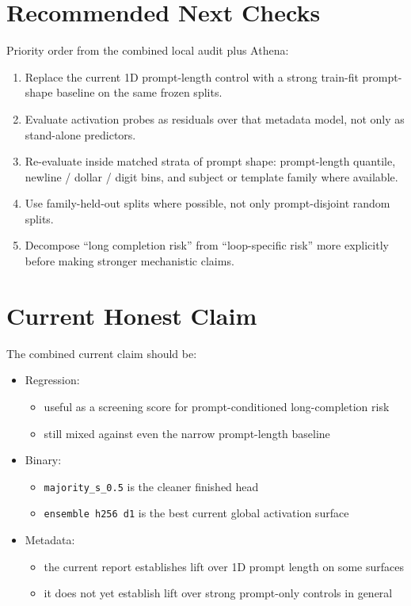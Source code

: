 \documentclass[11pt]{article}
\begin{document}
\section*{Recommended Next Checks}
Priority order from the combined local audit plus Athena:
\begin{enumerate}[leftmargin=1.5em]
\item Replace the current 1D prompt-length control with a strong train-fit prompt-shape baseline on the same frozen splits.
\item Evaluate activation probes as residuals over that metadata model, not only as stand-alone predictors.
\item Re-evaluate inside matched strata of prompt shape:
  prompt-length quantile, newline / dollar / digit bins, and subject or template family where available.
\item Use family-held-out splits where possible, not only prompt-disjoint random splits.
\item Decompose ``long completion risk'' from ``loop-specific risk'' more explicitly before making stronger mechanistic claims.
\end{enumerate}

\section*{Current Honest Claim}
The combined current claim should be:
\begin{itemize}[leftmargin=1.5em]
\item Regression:
  \begin{itemize}[leftmargin=1.5em]
  \item useful as a screening score for prompt-conditioned long-completion risk
  \item still mixed against even the narrow prompt-length baseline
  \end{itemize}
\item Binary:
  \begin{itemize}[leftmargin=1.5em]
  \item \texttt{majority\_s\_0.5} is the cleaner finished head
  \item \texttt{ensemble h256 d1} is the best current global activation surface
  \end{itemize}
\item Metadata:
  \begin{itemize}[leftmargin=1.5em]
  \item the current report establishes lift over 1D prompt length on some surfaces
  \item it does not yet establish lift over strong prompt-only controls in general
  \end{itemize}
\end{itemize}
\end{document}
